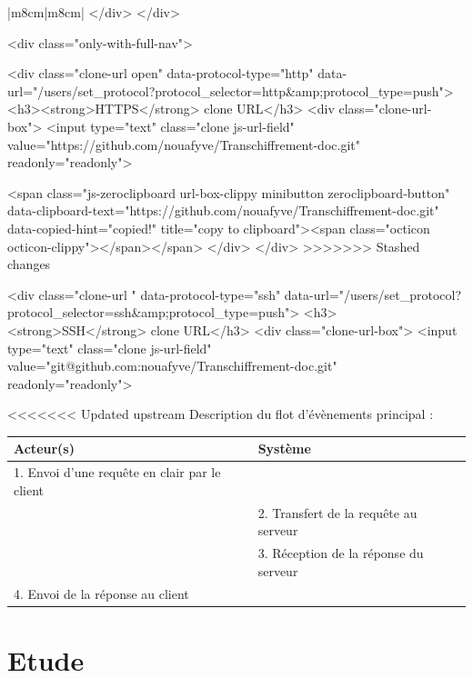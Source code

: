 \documentclass[a4paper,11pt,french]{article}
\begin{document}
\begin{tabular}{|m{8cm}|m{8cm}|}
  </div>
</div>

            <div class="only-with-full-nav">
              

  

<div class="clone-url open"
  data-protocol-type="http"
  data-url="/users/set_protocol?protocol_selector=http&amp;protocol_type=push">
  <h3><strong>HTTPS</strong> clone URL</h3>
  <div class="clone-url-box">
    <input type="text" class="clone js-url-field"
           value="https://github.com/nouafyve/Transchiffrement-doc.git" readonly="readonly">

    <span class="js-zeroclipboard url-box-clippy minibutton zeroclipboard-button" data-clipboard-text="https://github.com/nouafyve/Transchiffrement-doc.git" data-copied-hint="copied!" title="copy to clipboard"><span class="octicon octicon-clippy"></span></span>
  </div>
</div>
>>>>>>> Stashed changes

  

<div class="clone-url "
  data-protocol-type="ssh"
  data-url="/users/set_protocol?protocol_selector=ssh&amp;protocol_type=push">
  <h3><strong>SSH</strong> clone URL</h3>
  <div class="clone-url-box">
    <input type="text" class="clone js-url-field"
           value="git@github.com:nouafyve/Transchiffrement-doc.git" readonly="readonly">

<<<<<<< Updated upstream
Description du flot d'évènements principal :

\begin{tabular}{|m{8cm}|m{8cm}|}
   \hline
  \rowcolor[gray]{.8} Acteur(s) & Système \\
   \hline
   1. Envoi d'une requête en clair par le client & \\
   \hline
& 2. Transfert de la requête au serveur  \\
& 3. Réception de la réponse du serveur  \\
   \hline
  
4. Envoi de la réponse au client  &  \\
   \hline
\end{tabular}

\section{Etude}


\end{tabular}
\end{document}
